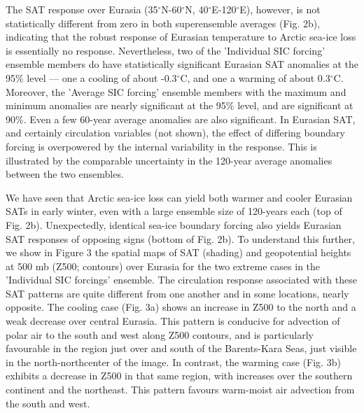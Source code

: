 \documentclass[grl]{AGUTeX}  %
\begin{document}
\begin{article}
The SAT response over Eurasia (35$^\circ$N-60$^\circ$N, 40$^\circ$E-120$^\circ$E), however, is not statistically different from zero in both superensemble averages (Fig. 2b), indicating that the robust response of Eurasian temperature to Arctic sea-ice loss is essentially no response. Nevertheless, two of the 'Individual SIC forcing' ensemble members do have statistically significant Eurasian SAT anomalies at the 95\% level --- one a cooling of about -0.3$^\circ$C, and one a warming of about 0.3$^\circ$C. Moreover, the 'Average SIC forcing' ensemble members with the maximum and minimum anomalies are nearly significant at the 95\% level, and are significant at 90\%. Even a few 60-year average anomalies are also significant. In Eurasian SAT, and certainly circulation variables (not shown), the effect of differing boundary forcing is overpowered by the internal variability in the response. This is illustrated by the comparable uncertainty in the 120-year average anomalies between the two ensembles.  %

We have seen that Arctic sea-ice loss can yield both warmer and cooler Eurasian SATs in early winter, even with a large ensemble size of 120-years each (top of Fig. 2b). Unexpectedly, identical sea-ice boundary forcing also yields Eurasian SAT responses of opposing signs (bottom of Fig. 2b). To understand this further, we show in Figure 3 the spatial maps of SAT (shading) and geopotential heights at 500 mb (Z500; contours) over Eurasia for the two extreme cases in the 'Individual SIC forcings' ensemble. The circulation response associated with these SAT patterns are quite different from one another and in some locations, nearly opposite. The cooling case (Fig. 3a) shows an increase in Z500 to the north and a weak decrease over central Eurasia. This pattern is conducive for advection of polar air to the south and west along Z500 contours, and is particularly favourable in the region just over and south of the Barents-Kara Seas, just visible in the north-northcenter of the image. In contrast, the warming case (Fig. 3b) exhibits a decrease in Z500 in that same region, with increases over the southern continent and the northeast. This pattern favours warm-moist air advection from the south and west. %


\end{article}
\end{document}
